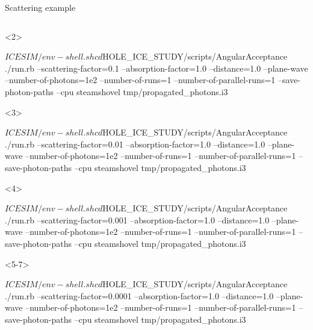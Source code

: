 \begin{frame}[fragile]{Scattering example}
\begin{columns}
\begin{column}{0.5\textwidth}
      \begin{onlyenv}<2>
        \begin{smallbash}
          $ICESIM/env-shell.sh
          cd $HOLE_ICE_STUDY/scripts/AngularAcceptance
          ./run.rb --scattering-factor=0.1 --absorption-factor=1.0 --distance=1.0 --plane-wave --number-of-photons=1e2 --number-of-runs=1 --number-of-parallel-runs=1 --save-photon-paths --cpu
          steamshovel tmp/propagated_photons.i3
        \end{smallbash}
      \end{onlyenv}

      \begin{onlyenv}<3>
        \begin{smallbash}
          $ICESIM/env-shell.sh
          cd $HOLE_ICE_STUDY/scripts/AngularAcceptance
          ./run.rb --scattering-factor=0.01 --absorption-factor=1.0 --distance=1.0 --plane-wave --number-of-photons=1e2 --number-of-runs=1 --number-of-parallel-runs=1 --save-photon-paths --cpu
          steamshovel tmp/propagated_photons.i3
        \end{smallbash}
      \end{onlyenv}

      \begin{onlyenv}<4>
        \begin{smallbash}
          $ICESIM/env-shell.sh
          cd $HOLE_ICE_STUDY/scripts/AngularAcceptance
          ./run.rb --scattering-factor=0.001 --absorption-factor=1.0 --distance=1.0 --plane-wave --number-of-photons=1e2 --number-of-runs=1 --number-of-parallel-runs=1 --save-photon-paths --cpu
          steamshovel tmp/propagated_photons.i3
        \end{smallbash}
      \end{onlyenv}

      \begin{onlyenv}<5-7>
        \begin{smallbash}
          $ICESIM/env-shell.sh
          cd $HOLE_ICE_STUDY/scripts/AngularAcceptance
          ./run.rb --scattering-factor=0.0001 --absorption-factor=1.0 --distance=1.0 --plane-wave --number-of-photons=1e2 --number-of-runs=1 --number-of-parallel-runs=1 --save-photon-paths --cpu
          steamshovel tmp/propagated_photons.i3
        \end{smallbash}
      \end{onlyenv}

    \end{column}
  \end{columns}


\end{frame}
